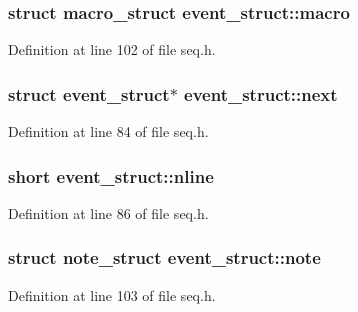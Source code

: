 \subsubsection[{\texorpdfstring{macro}{macro}}]{\setlength{\rightskip}{0pt plus 5cm}struct {\bf macro\+\_\+struct} event\+\_\+struct\+::macro}\hypertarget{structevent__struct_a48f2d877f0cdb494754971cfac040bb5}{}\label{structevent__struct_a48f2d877f0cdb494754971cfac040bb5}


Definition at line 102 of file seq.\+h.

\subsubsection[{\texorpdfstring{next}{next}}]{\setlength{\rightskip}{0pt plus 5cm}struct {\bf event\+\_\+struct}$\ast$ event\+\_\+struct\+::next}\hypertarget{structevent__struct_a7bd2f1e72c41332db1d5428d889d56d3}{}\label{structevent__struct_a7bd2f1e72c41332db1d5428d889d56d3}


Definition at line 84 of file seq.\+h.

\subsubsection[{\texorpdfstring{nline}{nline}}]{\setlength{\rightskip}{0pt plus 5cm}short event\+\_\+struct\+::nline}\hypertarget{structevent__struct_a356f757e3e9d870b423ccb3e0d3b2c7b}{}\label{structevent__struct_a356f757e3e9d870b423ccb3e0d3b2c7b}


Definition at line 86 of file seq.\+h.

\subsubsection[{\texorpdfstring{note}{note}}]{\setlength{\rightskip}{0pt plus 5cm}struct {\bf note\+\_\+struct} event\+\_\+struct\+::note}\hypertarget{structevent__struct_a3b05f65218a1caa9d02406871fb58954}{}\label{structevent__struct_a3b05f65218a1caa9d02406871fb58954}


Definition at line 103 of file seq.\+h.


